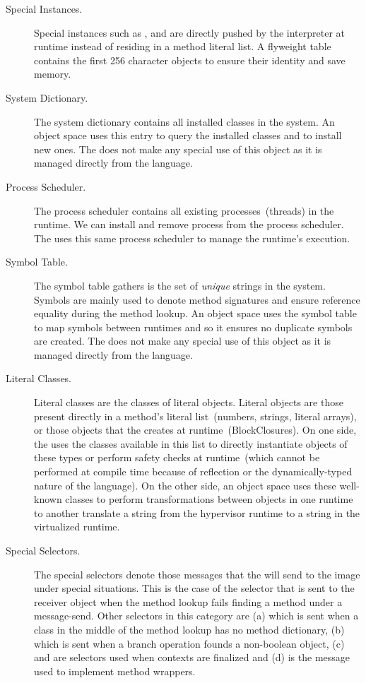 \begin{description}
\item[Special Instances.] Special instances such as ,  and  are directly pushed by the \VM interpreter at runtime instead of residing in a method literal list. A flyweight  table contains the first 256 character objects to ensure their identity and save memory.

\item[System Dictionary.] The system dictionary contains all installed classes in the system. An object space uses this entry to query the installed classes and to install new ones. The \VM does not make any special use of this object as it is managed directly from the language.

\item[Process Scheduler.] The process scheduler contains all existing processes~(threads) in the runtime. We can install and remove process from the process scheduler. The \VM uses this same process scheduler to manage the runtime's execution.

\item[Symbol Table.] The symbol table gathers is the set of \emph{unique} strings in the system. Symbols are mainly used to denote method signatures and ensure reference equality during the method lookup. An object space uses the symbol table to map symbols between runtimes and so it ensures no duplicate symbols are created. The \VM does not make any special use of this object as it is managed directly from the language.

\item[Literal Classes.] Literal classes are the classes of literal objects. Literal objects are those present directly in a method's literal list~(\eg numbers, strings, literal arrays), or those objects that the \VM creates at runtime~(\eg BlockClosures). On one side, the \VM uses the classes available in this list to directly instantiate objects of these types or perform safety checks at runtime~(which cannot be performed at compile time because of reflection or the dynamically-typed nature of the language). On the other side, an object space uses these well-known classes to perform transformations between objects in one runtime to another \eg translate a string from the hypervisor runtime to a string in the virtualized runtime.

\item[Special Selectors.] The special selectors denote those messages that the \VM will send to the image under special situations. This is the case of the  selector that is sent to the receiver object when the method lookup fails finding a method under a message-send. Other selectors in this category are (a) which is sent when a class in the middle of the method lookup has no method dictionary, (b)  which is sent when a branch operation founds a non-boolean object, (c)  and  are selectors used when contexts are finalized and (d) is the message used to implement method wrappers.

\end{description}



